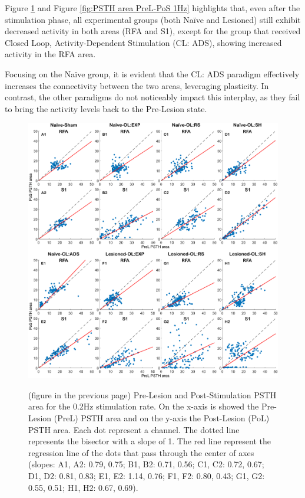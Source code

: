 Figure \ref{fig:PSTH area PreL-PoS 0.2Hz} and Figure \ref{fig:PSTH area PreL-PoS 1Hz} highlights that, even after the stimulation phase, all experimental groups (both Naïve and Lesioned) still exhibit decreased activity in both areas (RFA and S1), except for the group that received Closed Loop, Activity-Dependent Stimulation (CL: ADS), showing increased activity in the RFA area.

Focusing on the Naïve group, it is evident that the CL: ADS paradigm effectively increases the connectivity between the two areas, leveraging plasticity. In contrast, the other paradigms do not noticeably impact this interplay, as they fail to bring the activity levels back to the Pre-Lesion state.

\begin{figure}[htp]
    \begin{center}
    \includegraphics[width=\linewidth]{Figure/PSTH area PreL-PoS/PSTH area PreL-PoS 0.2Hz.jpg}
    \end{center}
\end{figure}
\begin{figure}[p!]
    \caption{(figure in the previous page) Pre-Lesion and Post-Stimulation PSTH area for the 0.2Hz stimulation rate. On the x-axis is showed the Pre- Lesion (PreL) PSTH area and on the y-axis the Post-Lesion (PoL) PSTH area. Each dot represent a channel. The dotted line represents the bisector with a slope of 1. The red line represent the regression line of the dots that pass through the center of axes (slopes: A1, A2: 0.79, 0.75; B1, B2: 0.71, 0.56; C1, C2: 0.72, 0.67; D1, D2: 0.81, 0.83; E1, E2: 1.14, 0.76; F1, F2: 0.80, 0.43; G1, G2: 0.55, 0.51; H1, H2: 0.67, 0.69).}
    \label{fig:PSTH area PreL-PoS 0.2Hz}
\end{figure}
\clearpage

